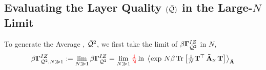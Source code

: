\subsection{Evaluating the Layer Quality \texorpdfstring{$(\bar{\mathcal{Q}})$}{Q} in the Large-\texorpdfstring{$N$}{N} Limit}
\label{sxn:matgen_evaluation_hciz}

To generate the Average \Quality, $\bar{\mathcal{Q}}^{2}$, we first take the \LargeN limit of $\beta\mathbf{\Gamma}^{IZ}_{\bar{\mathcal{Q}}^{2}}$ in $N$,
\begin{equation}
  \label{eqn:IZG_limit}
\IZGINF := \lim_{N \gg 1} \IZG 
= \lim_{N \gg 1}   \red{\tfrac{1}{N}}
\ln \; 
  \Expected[\AECS]{ 
    \exp\,
      N \beta \Trace{\tfrac{1}{N}\TMAT^{\top}\,\AECSN\,\TMAT}
  } 
\end{equation}
